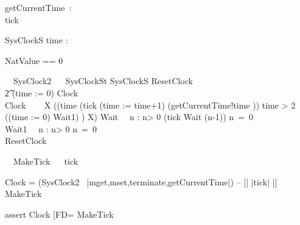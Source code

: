 
\begin{circus}
  \circchannel getCurrentTime~:~\nat\\
  \circchannel tick
\end{circus}

\begin{schema}{SysClockS}
 time : \nat
\end{schema}
\begin{zed}
NatValue == 0 
\end{zed}
\begin{circus}%
  \circprocess\ ~SysClock2 ~\circdef~\circbegin
  \circstate SysClockSt  SysClockS
  ResetClock ~\circdef~
  \\\t2  (time := 0) \circseq Clock\\
  Clock ~\circdef~ 
  \circmu~X \circspot 
    ((\circif time  \circthen (tick \then (time := time+1) \interleave (getCurrentTime!time \then \Skip))
        \circelse time > 2 \circthen ((time := 0) \circseq Wait1) 
        \circfi) \circseq X)
  Wait~\circdef~ \circvar n : \nat \circspot
   \circif n> 0 \circthen (tick \then Wait (n-1))
   \circelse n~=~0 \circthen \Skip
   \circfi\\
  Wait1~\circdef~ \circvar n : \nat \circspot
   \circif n> 0 \circthen \Skip
   \circelse n~=~0 \circthen \Skip
   \circfi\\
  \circspot ResetClock
  \circend
\end{circus}
\begin{circus}
\circprocess\ ~MakeTick ~\circdef~\circbegin
\circspot tick \then \Skip
\circend
\end{circus}

Clock = 
  (SysClock2 \ {|mget,mset,terminate,getCurrentTime|}) 
  -- [| {|tick|} |] MakeTick 

assert Clock [FD= MakeTick
